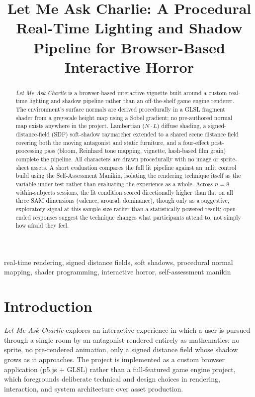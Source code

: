 \documentclass[conference]{IEEEtran}
\begin{document}
\title{Let Me Ask Charlie: A Procedural Real-Time Lighting and Shadow Pipeline for Browser-Based Interactive Horror}

\author{
}

\maketitle

\begin{abstract}
\textit{Let Me Ask Charlie} is a browser-based interactive vignette built around a custom real-time lighting and shadow pipeline rather than an off-the-shelf game engine renderer. The environment's surface normals are derived procedurally in a GLSL fragment shader from a greyscale height map using a Sobel gradient; no pre-authored normal map exists anywhere in the project. Lambertian ($N\cdot L$) diffuse shading, a signed-distance-field (SDF) soft-shadow raymarcher extended to a shared scene distance field covering both the moving antagonist and static furniture, and a four-effect post-processing pass (bloom, Reinhard tone mapping, vignette, hash-based film grain) complete the pipeline. All characters are drawn procedurally with no image or sprite-sheet assets. A short evaluation compares the full lit pipeline against an unlit control build using the Self-Assessment Manikin, isolating the rendering technique itself as the variable under test rather than evaluating the experience as a whole. Across $n=8$ within-subjects sessions, the lit condition scored directionally higher than flat on all three SAM dimensions (valence, arousal, dominance), though only as a suggestive, exploratory signal at this sample size rather than a statistically powered result; open-ended responses suggest the technique changes what participants attend to, not simply how afraid they feel.
\end{abstract}

\begin{IEEEkeywords}
real-time rendering, signed distance fields, soft shadows, procedural normal mapping, shader programming, interactive horror, self-assessment manikin
\end{IEEEkeywords}

\section{Introduction}
\textit{Let Me Ask Charlie} explores an interactive experience in which a user is pursued through a single room by an antagonist rendered entirely as mathematics: no sprite, no pre-rendered animation, only a signed distance field whose shadow grows as it approaches. The project is implemented as a custom browser application (p5.js + GLSL) rather than a full-featured game engine project, which foregrounds deliberate technical and design choices in rendering, interaction, and system architecture over asset production.
\end{document}

